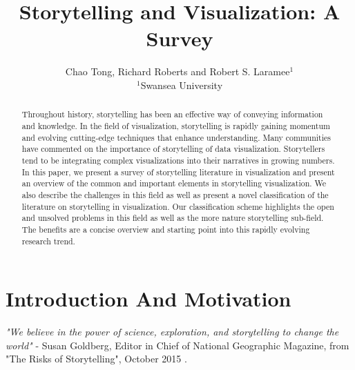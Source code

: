 \documentclass{egpubl}
\begin{document}
\title[Storytelling and Visualization: A Survey]%
      {Storytelling and Visualization: A Survey}

\author[C.Tong \& R.Roberts \& R.S.Laramee]
       {Chao Tong, Richard Roberts
        and Robert S. Laramee$^{1}$
        \\
        $^1$Swansea University
       }

\maketitle
\begin{abstract}
Throughout history, storytelling has been an effective way of conveying information and knowledge. In the field of visualization, storytelling is rapidly gaining momentum and evolving cutting-edge techniques that enhance understanding. Many communities have commented on the importance of storytelling of data visualization. Storytellers tend to be integrating complex visualizations into their narratives in growing numbers. In this paper, we present a survey of storytelling literature in visualization and present an overview of the common and important elements in storytelling visualization. We also describe the challenges in this field as well as present a novel classification of the literature on storytelling in visualization. Our classification scheme highlights the open and unsolved problems in this field as well as the more nature storytelling sub-field. The benefits are a concise overview and starting point into this rapidly evolving research trend.
\end{abstract}
\section{Introduction And Motivation}
\textit{"We believe in the power of science, exploration, and storytelling to change the world"} - Susan Goldberg, Editor in Chief of National Geographic Magazine, from "The Risks of Storytelling", October 2015 \cite{risks2015}. 
\end{document}
